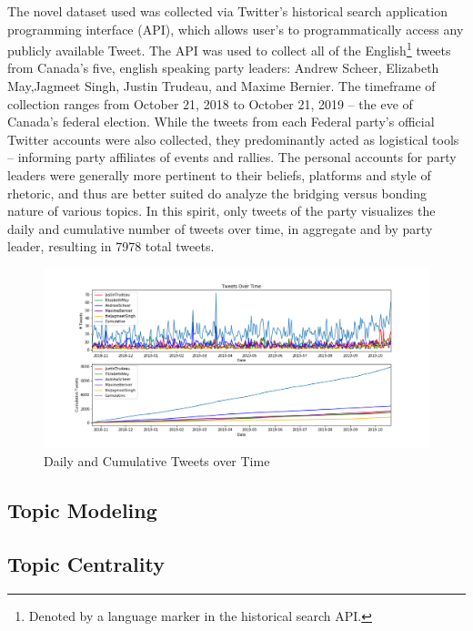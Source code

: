 \documentclass{nws}
\begin{document}
The novel dataset used was collected via Twitter's historical search application
programming interface (API), which allows user's to programmatically access any
publicly available Tweet. The API was used to collect all of the
English\footnote{Denoted by a language marker in the historical search API.}
tweets from Canada's five, english speaking party leaders: Andrew Scheer,
Elizabeth May,Jagmeet Singh, Justin Trudeau, and Maxime Bernier. The timeframe
of collection ranges from October 21, 2018 to October 21, 2019 -- the eve of
Canada’s federal election. While the tweets from each Federal party’s official
Twitter accounts were also collected, they predominantly acted as logistical
tools – informing party affiliates of events and rallies. The personal accounts
for party leaders were generally more pertinent to their beliefs, platforms and
style of rhetoric, and thus are better suited do analyze the bridging versus
bonding nature of various topics. In this spirit, only tweets of the party
visualizes the daily and cumulative number of tweets over time, in aggregate and
by party leader, resulting in 7978 total tweets.

  \begin{figure}[H]
  \centering
  \includegraphics[scale=0.40]{figures/tweets_over_time}
  \caption[Daily and Cumulative Tweets over Time]{Daily and Cumulative Tweets over Time}
  \label{fig:tweets_over_time}
  \end{figure}



\subsection{Topic Modeling}

\subsection{Topic Centrality}
\end{document}
